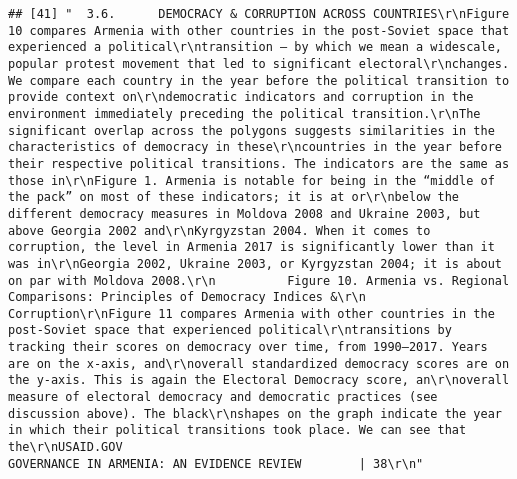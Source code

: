 \documentclass[
]{article}
\begin{document}
\begin{verbatim}
## [41] "  3.6.      DEMOCRACY & CORRUPTION ACROSS COUNTRIES\r\nFigure 10 compares Armenia with other countries in the post-Soviet space that experienced a political\r\ntransition – by which we mean a widescale, popular protest movement that led to significant electoral\r\nchanges. We compare each country in the year before the political transition to provide context on\r\ndemocratic indicators and corruption in the environment immediately preceding the political transition.\r\nThe significant overlap across the polygons suggests similarities in the characteristics of democracy in these\r\ncountries in the year before their respective political transitions. The indicators are the same as those in\r\nFigure 1. Armenia is notable for being in the “middle of the pack” on most of these indicators; it is at or\r\nbelow the different democracy measures in Moldova 2008 and Ukraine 2003, but above Georgia 2002 and\r\nKyrgyzstan 2004. When it comes to corruption, the level in Armenia 2017 is significantly lower than it was in\r\nGeorgia 2002, Ukraine 2003, or Kyrgyzstan 2004; it is about on par with Moldova 2008.\r\n          Figure 10. Armenia vs. Regional Comparisons: Principles of Democracy Indices &\r\n          Corruption\r\nFigure 11 compares Armenia with other countries in the post-Soviet space that experienced political\r\ntransitions by tracking their scores on democracy over time, from 1990–2017. Years are on the x-axis, and\r\noverall standardized democracy scores are on the y-axis. This is again the Electoral Democracy score, an\r\noverall measure of electoral democracy and democratic practices (see discussion above). The black\r\nshapes on the graph indicate the year in which their political transitions took place. We can see that the\r\nUSAID.GOV                                                   GOVERNANCE IN ARMENIA: AN EVIDENCE REVIEW        | 38\r\n"                                                                                                                                                                                                                                                                                                                                                                                                                                                                                                                                                                                                                                                                                                                                                                                                                                                                                                                                                                                                                                                                                                                                                                                                                                                                                                                                                                                                                                                                                     
\end{verbatim}
\end{document}

